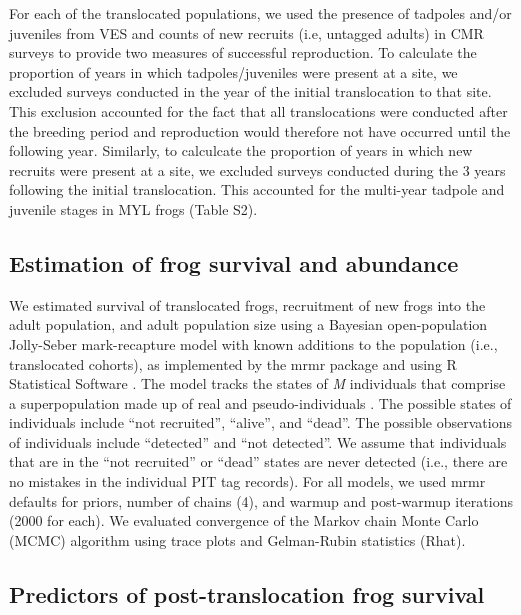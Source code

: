 \documentclass[9pt,twocolumn,twoside,lineno]{pnas-new}
\begin{document}
{For each of the translocated populations, we used the presence of
tadpoles and/or juveniles from VES and counts of new recruits (i.e,
untagged adults) in CMR surveys to provide two measures of successful
reproduction. To calculate the proportion of years in which
tadpoles/juveniles were present at a site, we excluded surveys conducted
in the year of the initial translocation to that site. This exclusion
accounted for the fact that all translocations were conducted after the
breeding period and reproduction would therefore not have occurred until
the following year. Similarly, to calculcate the proportion of years in
which new recruits were present at a site, we excluded surveys conducted
during the 3 years following the initial translocation. This accounted
for the multi-year tadpole and juvenile stages in MYL frogs
(Table S2).

\hypertarget{estimation-of-frog-survival-and-abundance}{%
\subsection*{Estimation of frog survival and
abundance}\label{estimation-of-frog-survival-and-abundance}}

We estimated survival of translocated frogs, recruitment of new frogs
into the adult population, and adult population size using a Bayesian
open-population Jolly-Seber mark-recapture model with known additions to
the population (i.e., translocated cohorts), as implemented by the mrmr
package \citep{joseph2019} and using R Statistical Software
\citep[v4.4.4,][]{rsoftware2022}. The model tracks the states of
\emph{M} individuals that comprise a superpopulation made up of real and
pseudo-individuals \citep[see][ for details]{joseph2018}. The possible
states of individuals include ``not recruited'', ``alive'', and
``dead''. The possible observations of individuals include ``detected''
and ``not detected''. We assume that individuals that are in the ``not
recruited'' or ``dead'' states are never detected (i.e., there are no
mistakes in the individual PIT tag records). For all models, we used
mrmr defaults for priors, number of chains (4), and warmup and
post-warmup iterations (2000 for each). We evaluated convergence of the
Markov chain Monte Carlo (MCMC) algorithm using trace plots and
Gelman-Rubin statistics (Rhat).

\hypertarget{predictors-of-post-translocation-frog-survival}{%
\subsection*{Predictors of post-translocation frog
survival}\label{predictors-of-post-translocation-frog-survival}}

}
\end{document}

